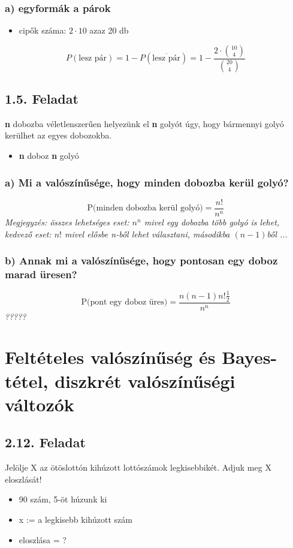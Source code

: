 \documentclass{article}
\begin{document}
\subsubsection*{a) egyformák a párok}
\begin{itemize}
 \item cipők száma: $2 \cdot 10$ azaz 20 db
\end{itemize}
\[ P( \text{lesz pár}) = 1 - P( \overline{\text{lesz pár}}) = 1 -\frac{2 \cdot \binom{10}{4}}{\binom{20}{4}} \]


\subsection*{1.5. Feladat}
 \textbf{n} dobozba véletlenszerűen helyezünk el \textbf{n} golyót úgy, hogy bármennyi golyó kerülhet az egyes dobozokba.
\begin{itemize}
    \item \textbf{n} doboz \textbf{n} golyó
   \end{itemize}
\subsubsection*{a) Mi a valószínűsége, hogy minden dobozba kerül golyó?}
\[ \text{P(minden dobozba kerül golyó)} = \frac{n!}{n^n} \]
\textit{Megjegyzés: összes lehetséges eset: $n^n$ mivel egy dobozba több golyó is lehet, kedvező eset: $n!$ mivel elősbe n-ből lehet választani, másodikba $(n-1)$ből ...}


\subsubsection*{b) Annak mi a valószínűsége, hogy pontosan egy doboz marad üresen?}
\[ \text{P(pont egy doboz üres)} = \frac{n(n-1)n!\frac{1}{2}}{n^n} \]
\textit{?????}

\section{Feltételes valószínűség és Bayes-tétel, diszkrét valószínűségi változók}
\subsection{2.12. Feladat}
Jelölje X az ötöslottón kihúzott lottószámok legkisebbikét. Adjuk meg X eloszlását!

\begin{itemize}
    \item 90 szám, 5-öt húzunk ki
    \item x := a legkisebb kihúzott szám
    \item eloszlása = ?
\end{itemize}
\end{document}
